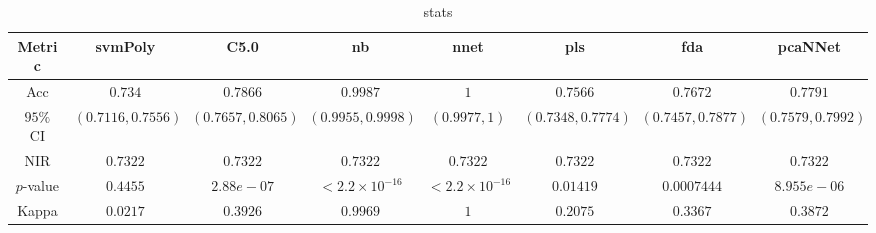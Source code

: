 \begin{table}[!ht]
	\centering
	\begin{tabular}{|c|c|c|c|c|c|c|c|}
		\hline
		Metric & svmPoly & C5.0 & nb & nnet & pls & fda & pcaNNet \\ \hline
		Acc & $0.734$ & $0.7866$ & $0.9987$ & $1$ & $0.7566$ & $0.7672$ & $0.7791$ \\ \hline
		$95\%$ CI & $(0.7116, 0.7556)$ & $(0.7657, 0.8065)$ & $(0.9955, 0.9998)$ & $(0.9977, 1)$ & $(0.7348, 0.7774)$ & $(0.7457, 0.7877)$ & $(0.7579, 0.7992)$ \\ \hline
		NIR & $0.7322$ & $0.7322$ & $0.7322$ & $0.7322$ & $0.7322$ & $0.7322$ & $0.7322$ \\ \hline
		$p$-value & $0.4455$ & $2.88e-07$ & $< 2.2 \times {10}^{-16}$ & $< 2.2 \times {10}^{-16}$ & $0.01419$ & $0.0007444$ & $8.955e-06$ \\ \hline
		Kappa & $0.0217$ & $0.3926$ & $0.9969$ & $1$ & $0.2075$ & $0.3367$ & $0.3872$ \\ \hline
	\end{tabular}
	\caption{stats}
	\label{tab:stats}
\end{table}
